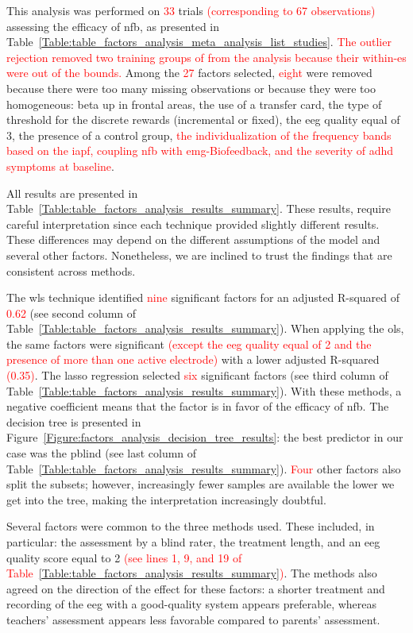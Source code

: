 This analysis was performed on \textcolor{red}{33} trials \textcolor{red}{(corresponding to 67 observations)} assessing the efficacy of \gls{nfb}, as presented 
in Table~\ref{Table:table_factors_analysis_meta_analysis_list_studies}. \textcolor{red}{The outlier rejection removed two training groups
of \citet{Bazanova2018} from the analysis because their within-\gls{es} were out of the bounds.} Among the \textcolor{red}{27} 
factors selected, \textcolor{red}{eight} were removed because there were too many missing observations or because they were too homogeneous: beta up in frontal areas, 
the use of a transfer card, the type of threshold for the discrete rewards (incremental or fixed), the \gls{eeg} quality equal of 3, the 
presence of a control group, \textcolor{red}{the individualization of the frequency bands based on the \gls{iapf}, coupling 
\gls{nfb} with \gls{emg}-Biofeedback, and the severity of \gls{adhd} symptoms at baseline}.  

All results are presented in Table~\ref{Table:table_factors_analysis_results_summary}. These results, require 
careful interpretation since each technique provided slightly different results. These differences 
may depend on the different assumptions of the model and several other factors. Nonetheless, we are inclined to 
trust the findings that are consistent across methods. 

The \gls{wls} technique identified \textcolor{red}{nine} significant factors for an adjusted R-squared of \textcolor{red}{0.62} (see second column of 
Table~\ref{Table:table_factors_analysis_results_summary}). 
When applying the \gls{ols}, the same factors were significant \textcolor{red}{(except the \gls{eeg} quality equal of 2 and the presence of more than one active electrode)}
with a lower adjusted R-squared \textcolor{red}{(0.35)}. The \gls{lasso} regression selected \textcolor{red}{six} significant factors (see third column of 
Table~\ref{Table:table_factors_analysis_results_summary}). With these methods, a negative coefficient means 
that the factor is in favor of the efficacy of \gls{nfb}. The decision tree is presented in Figure~\ref{Figure:factors_analysis_decision_tree_results}: 
the best predictor in our case was the \gls{pblind} (see last column of 
Table~\ref{Table:table_factors_analysis_results_summary}). \textcolor{red}{Four} other factors also split the subsets; however, 
increasingly fewer samples are available the lower we get into the tree, making the interpretation increasingly doubtful.  

Several factors were common to the three methods used. These included, in particular: the assessment 
by a blind rater, the treatment length, and an \gls{eeg} quality score equal to 2 \textcolor{red}{(see lines 1, 9, and 19 of 
Table~\ref{Table:table_factors_analysis_results_summary})}.
The methods also agreed on the direction of the effect for these factors: 
a shorter treatment and recording of the \gls{eeg} with a good-quality system appears preferable, whereas teachers' assessment appears less favorable 
compared to parents' assessment.


